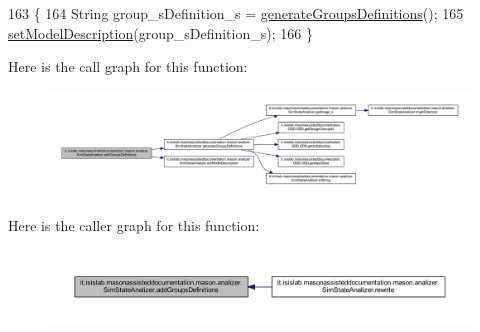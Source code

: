 \begin{DoxyCode}
163                                         \{
164         String group\_sDefinition\_s = \hyperlink{classit_1_1isislab_1_1masonassisteddocumentation_1_1mason_1_1analizer_1_1_sim_state_analizer_a08b8bb716aa03be25e82146ecbc77612}{generateGroupsDefinitions}();
165         \hyperlink{classit_1_1isislab_1_1masonassisteddocumentation_1_1mason_1_1analizer_1_1_sim_state_analizer_a17e7eab8f806cd6a275ed1ff4c9682db}{setModelDescription}(group\_sDefinition\_s);
166     \}
\end{DoxyCode}


Here is the call graph for this function\-:
\nopagebreak
\begin{figure}[H]
\begin{center}
\leavevmode
\includegraphics[width=350pt]{classit_1_1isislab_1_1masonassisteddocumentation_1_1mason_1_1analizer_1_1_sim_state_analizer_a686b1fdc9c973e289069372ada60c1c8_cgraph}
\end{center}
\end{figure}




Here is the caller graph for this function\-:
\nopagebreak
\begin{figure}[H]
\begin{center}
\leavevmode
\includegraphics[width=350pt]{classit_1_1isislab_1_1masonassisteddocumentation_1_1mason_1_1analizer_1_1_sim_state_analizer_a686b1fdc9c973e289069372ada60c1c8_icgraph}
\end{center}
\end{figure}


